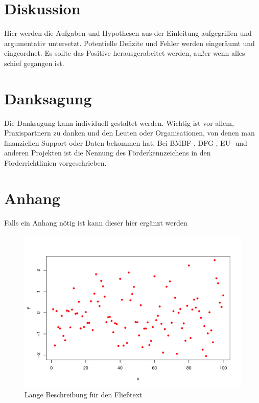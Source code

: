 \documentclass[english,ngerman,BCOR=6mm,cdgeometry=no,DIV=13]{tudscrreprt}
\begin{document}
\chapter{Diskussion}

Hier werden die Aufgaben und Hypothesen aus der Einleitung aufgegriffen und
argumentativ untersetzt. Potentielle Defizite und Fehler werden eingeräumt und
eingeordnet. Es sollte das Positive herausgerabeitet werden, außer wenn alles
schief gegangen ist.

\chapter*{Danksagung} %


Die Danksagung kann individuell gestaltet werden. Wichtig ist vor allem,
Praxispartnern zu danken und den Leuten oder Organisationen, von denen man
finanziellen Support oder Daten bekommen hat. Bei BMBF-, DFG-, EU- und anderen
Projekten ist die Nennung des Förderkennzeichens in den Förderrichtlinien
vorgeschrieben.


\printbibliography



\setcounter{chapter}{0}
\renewcommand\thechapter{\Alph{chapter}}
\chapter{Anhang}

Falls ein Anhang nötig ist kann dieser hier ergänzt werden

\begin{figure}[h]
	\includegraphics[width=\linewidth]{pdf-plot.pdf}
	\caption[kurze Beschreibung für die Liste der Abbildungen]{Lange Beschreibung für den Fließtext}
\end{figure}
\end{document}
